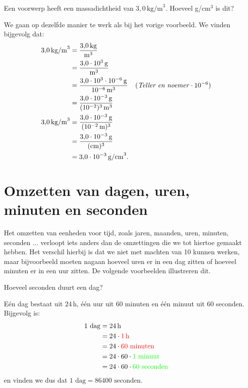 \documentclass{ximera}
\begin{document}
\begin{example}[foldable=true,title={Voorbeeld: massadichtheid omzetten}]\nl
    Een voorwerp heeft een massadichtheid van $3{,}0 \, \mathrm{kg/m}^{3}$. Hoeveel g/cm$^{3}$ is dit?

    \begin{solution}\nl
        We gaan op dezelfde manier te werk als bij het vorige voorbeeld. We vinden bijgevolg dat:
        \begin{align*}
        3{,}0 \, \mathrm{kg/m}^{3} & = \frac{3{,}0 \, \mathrm{kg}}{\mathrm{m}^{3}} \\
        & = \frac{3{,}0 \cdot 10^{3} \, \mathrm{g}}{\mathrm{m}^{3}} \\
        & = \frac{3{,}0 \cdot 10^{3} \cdot 10^{-6} \, \mathrm{g}}{10^{-6}\, \mathrm{m}^{3}} & (\text{\textit{Teller en noemer}} \cdot 10^{-6}) \\
        & = \frac{3{,}0 \cdot 10^{-3} \, \mathrm{g}}{(10^{-2})^{3} \, \mathrm{m}^{3}} \\
        3{,}0 \, \mathrm{kg/m}^{3} & = \frac{3{,}0 \cdot 10^{-3} \, \mathrm{g}}{(10^{-2} \, \mathrm{m})^{3}} \\
        & = \frac{3{,}0 \cdot 10^{-3} \, \mathrm{g}}{(\mathrm{cm})^{3}} \\
        & = 3{,}0 \cdot 10^{-3} \, \mathrm{g/cm}^{3}.
        \end{align*}
    \end{solution}
\end{example}

\section{Omzetten van dagen, uren, minuten en seconden}
Het omzetten van eenheden voor tijd, zoals jaren, maanden, uren, minuten, seconden ... verloopt iets anders dan de omzettingen die we tot hiertoe gemaakt hebben. Het verschil hierbij is dat we niet met machten van 10 kunnen werken, maar bijvoorbeeld moeten nagaan hoeveel uren er in een dag zitten of hoeveel minuten er in een uur zitten. De volgende voorbeelden illustreren dit.

\begin{example}[foldable=true,title={Voorbeeld: aantal seconden in een dag}]\nl
    Hoeveel seconden duurt een dag?

    \begin{solution}\nl
        Eén dag bestaat uit $24\,\mathrm{h}$, één uur uit 60 minuten en één minuut uit 60 seconden. Bijgevolg is:
        \begin{align*}
        1 \text{ dag} & = 24 \, \mathrm{h} \\
        & = 24 \cdot \textcolor{red}{1 \, \mathrm{h}} \\
        & = 24 \cdot \textcolor{red}{60 \text{ minuten}} \\
        & = 24 \cdot 60 \cdot \textcolor{green}{1 \text{ minuut}} \\
        & = 24 \cdot 60 \cdot \textcolor{green}{60 \text{ seconden}}
        \end{align*}
        en vinden we dus dat $1 \text{ dag} = 86400 \text{ seconden}$.
    \end{solution}
\end{example}
\end{document}

